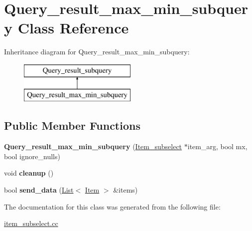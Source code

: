 \hypertarget{classQuery__result__max__min__subquery}{}\section{Query\+\_\+result\+\_\+max\+\_\+min\+\_\+subquery Class Reference}
\label{classQuery__result__max__min__subquery}
Inheritance diagram for Query\+\_\+result\+\_\+max\+\_\+min\+\_\+subquery\+:\begin{figure}[H]
\begin{center}
\leavevmode
\includegraphics[height=2.000000cm]{classQuery__result__max__min__subquery}
\end{center}
\end{figure}
\subsection*{Public Member Functions}
\begin{DoxyCompactItemize}
\item 
\mbox{\label{classQuery__result__max__min__subquery_a9d6661365bbf70df3526ab785cf35b59}} 
{\bfseries Query\+\_\+result\+\_\+max\+\_\+min\+\_\+subquery} (\mbox{\hyperlink{classItem__subselect}{Item\+\_\+subselect}} $\ast$item\+\_\+arg, bool mx, bool ignore\+\_\+nulls)
\item 
\mbox{\label{classQuery__result__max__min__subquery_af922b58349457b93dc6683e94aaf78a7}} 
void {\bfseries cleanup} ()
\item 
\mbox{\label{classQuery__result__max__min__subquery_a0616fdcc55df096d18ce3975adee5eca}} 
bool {\bfseries send\+\_\+data} (\mbox{\hyperlink{classList}{List}}$<$ \mbox{\hyperlink{classItem}{Item}} $>$ \&items)
\end{DoxyCompactItemize}


The documentation for this class was generated from the following file\+:\begin{DoxyCompactItemize}
\item 
\mbox{\hyperlink{item__subselect_8cc}{item\+\_\+subselect.\+cc}}\end{DoxyCompactItemize}
